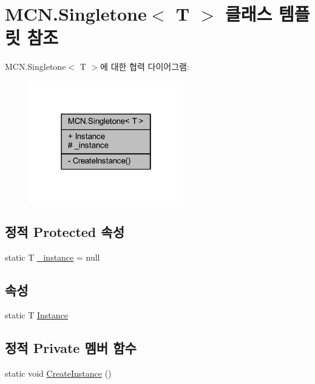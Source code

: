\hypertarget{class_m_c_n_1_1_singletone}{}\section{M\+C\+N.\+Singletone$<$ T $>$ 클래스 템플릿 참조}
\label{class_m_c_n_1_1_singletone}


M\+C\+N.\+Singletone$<$ T $>$에 대한 협력 다이어그램\+:\nopagebreak
\begin{figure}[H]
\begin{center}
\leavevmode
\includegraphics[width=190pt]{class_m_c_n_1_1_singletone__coll__graph}
\end{center}
\end{figure}
\subsection*{정적 Protected 속성}
\begin{DoxyCompactItemize}
\item 
static T \hyperlink{class_m_c_n_1_1_singletone_a267e8a9e6e7c073b988cda4f95e26eb1}{\+\_\+instance} = null
\end{DoxyCompactItemize}
\subsection*{속성}
\begin{DoxyCompactItemize}
\item 
static T \hyperlink{class_m_c_n_1_1_singletone_a46dbbebd93e96a9592a9803c51f35602}{Instance}
\end{DoxyCompactItemize}
\subsection*{정적 Private 멤버 함수}
\begin{DoxyCompactItemize}
\item 
static void \hyperlink{class_m_c_n_1_1_singletone_a4f4f62d67cc4a98909639d3e09eaef07}{Create\+Instance} ()
\end{DoxyCompactItemize}


